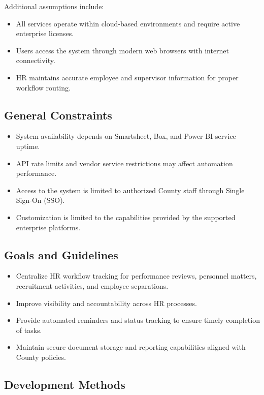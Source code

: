\documentclass[12pt]{article}
\begin{document}
Additional assumptions include:

\begin{itemize}
    \item All services operate within cloud-based environments and require active enterprise licenses.
    \item Users access the system through modern web browsers with internet connectivity.
    \item HR maintains accurate employee and supervisor information for proper workflow routing.
\end{itemize}

\subsection{General Constraints}

\begin{itemize}
    \item System availability depends on Smartsheet, Box, and Power BI service uptime.
    \item API rate limits and vendor service restrictions may affect automation performance.
    \item Access to the system is limited to authorized County staff through Single Sign-On (SSO).
    \item Customization is limited to the capabilities provided by the supported enterprise platforms.
\end{itemize}

\subsection{Goals and Guidelines}

\begin{itemize}
    \item Centralize HR workflow tracking for performance reviews, personnel matters, recruitment activities, and employee separations.
    \item Improve visibility and accountability across HR processes.
    \item Provide automated reminders and status tracking to ensure timely completion of tasks.
    \item Maintain secure document storage and reporting capabilities aligned with County policies.
\end{itemize}

\subsection{Development Methods}
\end{document}
